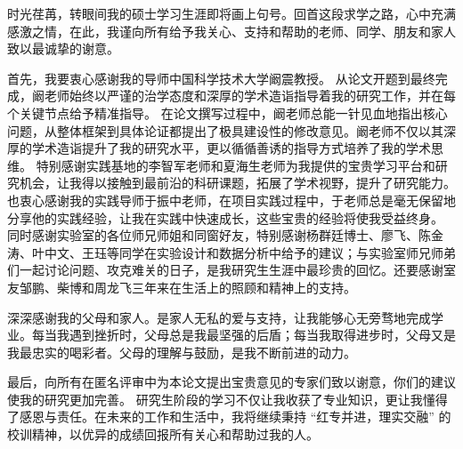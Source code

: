
\begin{acknowledgements}
时光荏苒，转眼间我的硕士学习生涯即将画上句号。回首这段求学之路，心中充满感激之情，在此，我谨向所有给予我关心、支持和帮助的老师、同学、朋友和家人致以最诚挚的谢意。

首先，我要衷心感谢我的导师中国科学技术大学阚震教授。
从论文开题到最终完成，阚老师始终以严谨的治学态度和深厚的学术造诣指导着我的研究工作，并在每个关键节点给予精准指导。
在论文撰写过程中，阚老师总能一针见血地指出核心问题，从整体框架到具体论证都提出了极具建设性的修改意见。阚老师不仅以其深厚的学术造诣提升了我的研究水平，更以循循善诱的指导方式培养了我的学术思维。
特别感谢实践基地的李智军老师和夏海生老师为我提供的宝贵学习平台和研究机会，让我得以接触到最前沿的科研课题，拓展了学术视野，提升了研究能力。
也衷心感谢我的实践导师于振中老师，在项目实践过程中，于老师总是毫无保留地分享他的实践经验，让我在实践中快速成长，这些宝贵的经验将使我受益终身。
同时感谢实验室的各位师兄师姐和同窗好友，特别感谢杨群廷博士、廖飞、陈金涛、叶中文、王珏等同学在实验设计和数据分析中给予的建议；与实验室师兄师弟们一起讨论问题、攻克难关的日子，是我研究生生涯中最珍贵的回忆。还要感谢室友邹鹏、柴博和周龙飞三年来在生活上的照顾和精神上的支持。

深深感谢我的父母和家人。是家人无私的爱与支持，让我能够心无旁骛地完成学业。每当我遇到挫折时，父母总是我最坚强的后盾；每当我取得进步时，父母又是我最忠实的喝彩者。父母的理解与鼓励，是我不断前进的动力。

最后，向所有在匿名评审中为本论文提出宝贵意见的专家们致以谢意，你们的建议使我的研究更加完善。
研究生阶段的学习不仅让我收获了专业知识，更让我懂得了感恩与责任。在未来的工作和生活中，我将继续秉持 “红专并进，理实交融” 的校训精神，以优异的成绩回报所有关心和帮助过我的人。
\end{acknowledgements}
